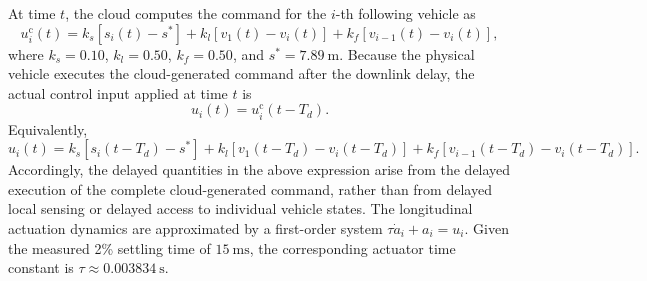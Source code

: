 \documentclass[11pt]{article}
\begin{document}
At time $t$, the cloud computes the command for the $i$-th following vehicle as
\[
u_i^{\mathrm{c}}(t) = k_s\left[s_i(t)-s^\ast\right] + k_l\left[v_1(t)-v_i(t)\right] + k_f\left[v_{i-1}(t)-v_i(t)\right],
\]
where $k_s=0.10$, $k_l=0.50$, $k_f=0.50$, and $s^\ast=7.89~\mathrm{m}$. Because the physical vehicle executes the cloud-generated command after the downlink delay, the actual control input applied at time $t$ is
\[
u_i(t) = u_i^{\mathrm{c}}(t-T_d).
\]
Equivalently,
\[
u_i(t) = k_s\left[s_i(t-T_d)-s^\ast\right] + k_l\left[v_1(t-T_d)-v_i(t-T_d)\right] + k_f\left[v_{i-1}(t-T_d)-v_i(t-T_d)\right].
\]
Accordingly, the delayed quantities in the above expression arise from the delayed execution of the complete cloud-generated command, rather than from delayed local sensing or delayed access to individual vehicle states.
The longitudinal actuation dynamics are approximated by a first-order system $\tau\dot{a}_i+a_i=u_i$. Given the measured 2\% settling time of $15~\mathrm{ms}$, the corresponding actuator time constant is $\tau \approx 0.003834~\mathrm{s}$.
\end{document}
